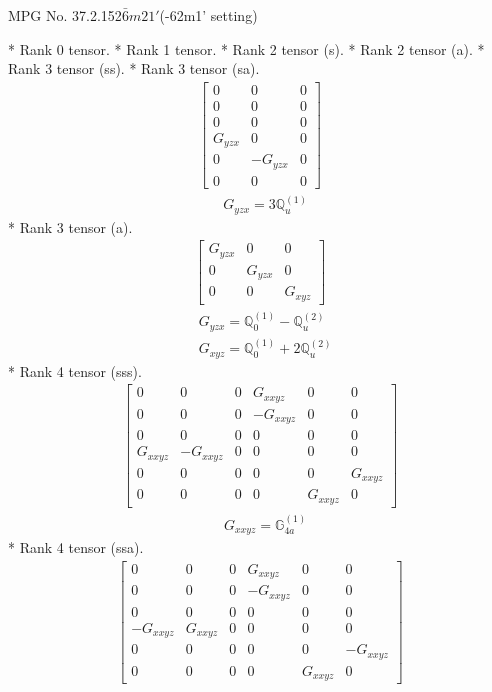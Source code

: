\documentclass[fleqn,8pt,landscape]{jsarticle}
\begin{document}
\setcounter{MaxMatrixCols}{32}

\renewcommand{\tablename}{Table~}
\renewcommand{\figurename}{Figure~}
\begin{center}
\LARGE
MPG No. 37.2.152\quad$\bar{6}m21'$\quad(-62m1' setting)
\end{center}
* Rank 0 tensor.
* Rank 1 tensor.
* Rank 2 tensor (s).
* Rank 2 tensor (a).
* Rank 3 tensor (ss).
* Rank 3 tensor (sa).
\begin{align*}
\begin{bmatrix} 0 & 0 & 0 \\ 0 & 0 & 0 \\ 0 & 0 & 0 \\ G_{yzx} & 0 & 0 \\ 0 & - G_{yzx} & 0 \\ 0 & 0 & 0 \end{bmatrix}
\end{align*}
\begin{align*}
& G_{yzx} = 3 \mathbb{Q}_{u}^{(1)}
\end{align*}
* Rank 3 tensor (a).
\begin{align*}
\begin{bmatrix} G_{yzx} & 0 & 0 \\ 0 & G_{yzx} & 0 \\ 0 & 0 & G_{xyz} \end{bmatrix}
\end{align*}
\begin{align*}
& G_{yzx} = \mathbb{Q}_{0}^{(1)} - \mathbb{Q}_{u}^{(2)} \\
& G_{xyz} = \mathbb{Q}_{0}^{(1)} + 2 \mathbb{Q}_{u}^{(2)}
\end{align*}
* Rank 4 tensor (sss).
\begin{align*}
\begin{bmatrix} 0 & 0 & 0 & G_{xxyz} & 0 & 0 \\ 0 & 0 & 0 & - G_{xxyz} & 0 & 0 \\ 0 & 0 & 0 & 0 & 0 & 0 \\ G_{xxyz} & - G_{xxyz} & 0 & 0 & 0 & 0 \\ 0 & 0 & 0 & 0 & 0 & G_{xxyz} \\ 0 & 0 & 0 & 0 & G_{xxyz} & 0 \end{bmatrix}
\end{align*}
\begin{align*}
& G_{xxyz} = \mathbb{G}_{4a}^{(1)}
\end{align*}
* Rank 4 tensor (ssa).
\begin{align*}
\begin{bmatrix} 0 & 0 & 0 & G_{xxyz} & 0 & 0 \\ 0 & 0 & 0 & - G_{xxyz} & 0 & 0 \\ 0 & 0 & 0 & 0 & 0 & 0 \\ - G_{xxyz} & G_{xxyz} & 0 & 0 & 0 & 0 \\ 0 & 0 & 0 & 0 & 0 & - G_{xxyz} \\ 0 & 0 & 0 & 0 & G_{xxyz} & 0 \end{bmatrix}
\end{align*}
\end{document}
